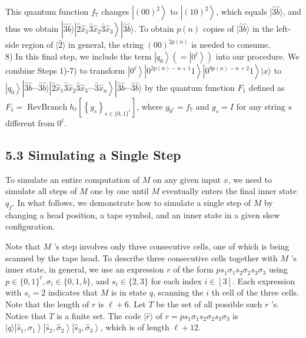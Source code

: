 \documentclass[10pt]{article}
\begin{document}
This quantum function $f_{7}$ changes $\left|(00)^{2}\right\rangle$ to $\left|(10)^{2}\right\rangle$, which equals $|\hat{3} \hat{b}\rangle$, and thus we obtain $|\hat{3} \hat{b}\rangle\left|\hat{2} \hat{x}_{1} \hat{3} \hat{x}_{2} \hat{3} \hat{x}_{3}\right\rangle|\hat{3} \hat{b}\rangle$. To obtain $p(n)$ copies of $|\hat{3} \hat{b}\rangle$ in the left-side region of $|\hat{2}\rangle$ in general, the string $(00)^{2 p(n)}$ is needed to consume.\\
8) In this final step, we include the term $\left|q_{0}\right\rangle\left(=\left|0^{\ell}\right\rangle\right)$ into our procedure. We combine Steps 1)-7) to transform $\left|0^{\ell}\right\rangle\left|0^{2 p(n)-n+1} 1\right\rangle\left|0^{8 p(n)-n+2} 1\right\rangle|x\rangle$ to $\left|q_{0}\right\rangle|\hat{3} \hat{b} \cdots \hat{3} \hat{b}\rangle\left|\hat{2} \hat{x}_{1} \hat{3} \hat{x}_{2} \hat{3} \hat{x}_{3} \cdots \hat{3} \hat{x}_{n}\right\rangle|\hat{3} \hat{b} \cdots \hat{3} \hat{b}\rangle$ by the quantum function $F_{1}$ defined as $F_{1}=\operatorname{RevBranch} h_{\ell}\left[\left\{g_{s}\right\}_{s \in\{0,1\}^{\ell}}\right]$, where $g_{0^{\ell}}=f_{7}$ and $g_{s}=I$ for any string $s$ different from $0^{\ell}$.

\subsection*{5.3 Simulating a Single Step}
To simulate an entire computation of $M$ on any given input $x$, we need to simulate all steps of $M$ one by one until $M$ eventually enters the final inner state $q_{f}$. In what follows, we demonstrate how to simulate a single step of $M$ by changing a head position, a tape symbol, and an inner state in a given skew configuration.

Note that $M$ 's step involves only three consecutive cells, one of which is being scanned by the tape head. To describe three consecutive cells together with $M$ 's inner state, in general, we use an expression $r$ of the form $p s_{1} \sigma_{1} s_{2} \sigma_{2} s_{3} \sigma_{3}$ using $p \in\{0,1\}^{\ell}, \sigma_{i} \in\{0,1, b\}$, and $s_{i} \in\{2,3\}$ for each index $i \in[3]$. Each expression with $s_{i}=2$ indicates that $M$ is in state $q$, scanning the $i$ th cell of the three cells. Note that the length of $r$ is $\ell+6$. Let $T$ be the set of all possible such $r$ 's. Notice that $T$ is a finite set. The code $|\hat{r}\rangle$ of $r=p s_{1} \sigma_{1} s_{2} \sigma_{2} s_{3} \sigma_{3}$ is $|q\rangle\left|\hat{s}_{1}, \hat{\sigma}_{1}\right\rangle\left|\hat{s}_{2}, \hat{\sigma}_{2}\right\rangle\left|\hat{s}_{3}, \hat{\sigma}_{3}\right\rangle$, which is of length $\ell+12$.
\end{document}
